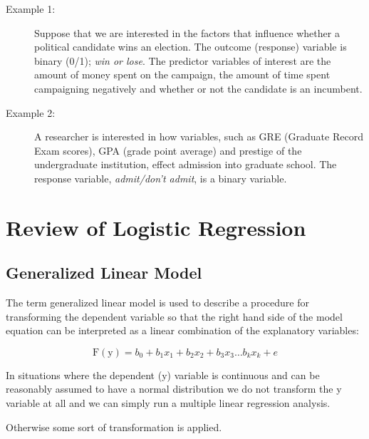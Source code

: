 \documentclass[a4paper,12pt]{article}
\begin{document}
\begin{description}
	\item[Example 1:]  Suppose that we are interested in the factors that influence whether a political candidate wins an election.  The outcome (response) variable is binary (0/1); \textit{ win or lose}.  The predictor variables of interest are the amount of money spent on the campaign, the amount of time spent campaigning negatively and whether or not the candidate is an incumbent.
	
	\item[Example 2:]  A researcher is interested in how variables, such as GRE (Graduate Record Exam scores), GPA (grade point average) and prestige of the undergraduate institution, effect admission into graduate school. The response variable, \textit{admit/don't admit}, is a binary variable.
\end{description}


\section{Review of Logistic Regression}

\subsection{Generalized Linear Model}

The term generalized linear model is used to describe a procedure for
transforming the dependent variable so that the right hand side of the model
equation can be interpreted as a linear combination of the explanatory variables:

\[ \operatorname{F(y)} = b_0 + b_1x_1 + b_2x_2 + b_3x_3 \ldots b_kx_k + e \]

In situations where the dependent (y) variable is continuous and can be
reasonably assumed to have a normal distribution we do not transform the y
variable at all and we can simply run a multiple linear regression analysis.

Otherwise some sort of transformation is applied.
\end{document}
